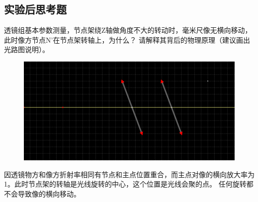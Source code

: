 \documentclass[dvipsnames, svgnames,a4paper,11pt]{article}
\begin{document}
\subsection{实验后思考题}
\begin{question}
	透镜组基本参数测量，节点架绕Z轴做角度不大的转动时，毫米尺像无横向移动，此时像方节点N’在节点架转轴上，为什么？ 请解释其背后的物理原理（建议画出光路图说明）。
	\tcblower
	\begin{figure}[H]
		\includegraphics[width=\textwidth]{透镜组光路图.png}
	\end{figure}
	因透镜物方和像方折射率相同有节点和主点位置重合，而主点对像的横向放大率为1。此时节点架的转轴是光线旋转的中心，这个位置是光线会聚的点。
	任何旋转都不会导致像的横向移动。
\end{question}
\end{document}
